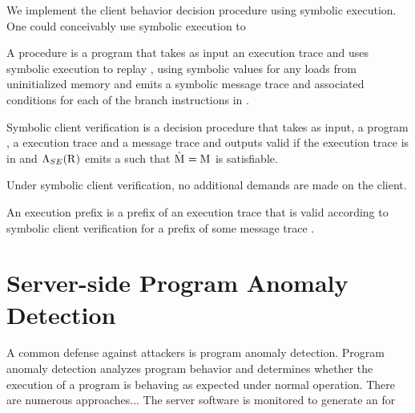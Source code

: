 We implement the client behavior decision procedure using symbolic
execution. One could conceivably use symbolic execution to 

\begin{definition}
  A procedure \symMachine{} is a program that takes as input
  an execution trace \execTrace{} and uses symbolic execution
  to replay \execTrace{}, using symbolic values for any loads from
  uninitialized memory and 
  emits a symbolic message trace \messageTrace{}
  and associated conditions for each of the branch instructions in
  \execTrace{}.
\end{definition}

\begin{definition}
  Symbolic client verification is a decision procedure that takes as
  input, a program \program{}, a execution trace \execTrace{} and a message
  trace \messageTrace{} and outputs valid if the execution trace
  \execTrace{} is in \lang{\program{}} and
  $\mathrm{\Lambda}_{SE}(\mathrm{R}_{})$ emits a \messageTraceAlt{} such that
  $\mathrm{\hat{M}_{}} = \mathrm{M}_{}$ is satisfiable.
\end{definition}

Under symbolic client verification, no additional demands are
made on the client. 

\begin{definition}
  An execution prefix \execPrefix{} is a prefix of an execution
  trace \execTrace{} that is valid according to symbolic client
  verification for a prefix of some  message trace \messageTrace{}.
\end{definition}

\section{Server-side Program Anomaly Detection}
A common defense against attackers is program anomaly detection.
Program anomaly detection analyzes program behavior and determines
whether the execution of a program is behaving as expected under
normal operation. There are numerous approaches... The server software
is monitored to generate an \execTrace{} for 

